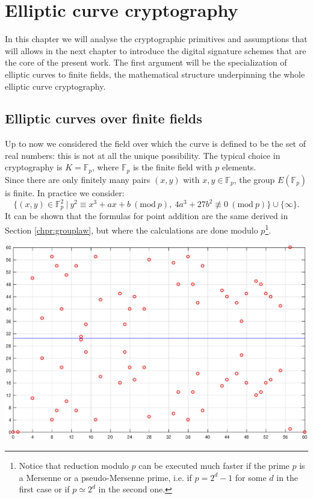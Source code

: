 \chapter{Elliptic curve cryptography}
\label{chpr:ecc}
In this chapter we will analyse the cryptographic primitives and assumptions that will allows in the next chapter to introduce the digital signature schemes that are the core of the present work. The first argument will be the specialization of elliptic curves to finite fields, the mathematical structure underpinning the whole elliptic curve cryptography.

\bigskip

\section{Elliptic curves over finite fields}
\label{ecoverff}
Up to now we considered the field over which the curve is defined to be the set of real numbers: this is not at all the unique possibility. The typical choice in cryptography is $K = \mathbb{F}_p$, where $\mathbb{F}_p$ is the finite field with $p$ elements. 
\\
Since there are only finitely many pairs $(x, y)$ with $x, y \in \mathbb{F}_p$, the group $E(\mathbb{F}_p)$ is finite.
In practice we consider: 
$$\{(x, y) \in \mathbb{F}_p^2 \ | \ y^2 \equiv x^3 + ax + b \ (\text{mod} \ p), \ 4a^3 + 27b^2 \not\equiv 0 \ (\text{mod} \ p)\} \cup \{\infty\}.$$
It can be shown that the formulas for point addition are the same derived in Section \ref{chpr:grouplaw}, but where the calculations are done modulo $p$\footnote{Notice that reduction modulo $p$ can be executed much faster if the prime $p$ is a Mersenne or a pseudo-Mersenne prime, i.e. if $p = 2^d - 1$ for some $d$ in the first case or if $p \simeq 2^d$ in the second one.}.
\\
\begin{center}
	\includegraphics[width=0.9\linewidth]{Images/ec_over_ff.eps}
	\label{fig:figure4}
\end{center}
